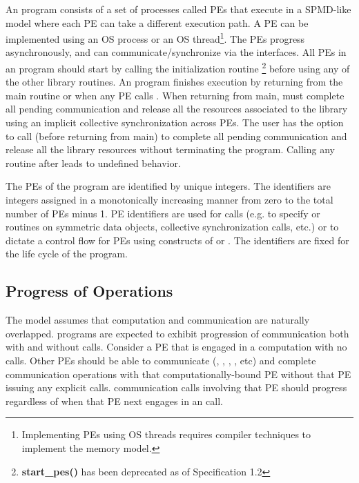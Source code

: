 An \openshmem program consists of a set of \openshmem processes called \ac{PE}s
that execute in a \ac{SPMD}-like model where each \ac{PE} can take a different
execution path. A \ac{PE} can be implemented using an OS process or an OS
thread\footnote{Implementing \ac{PE}s using OS threads requires compiler
techniques to implement the \openshmem memory model.}.  The \ac{PE}s progress
asynchronously, and can communicate/synchronize via the \openshmem interfaces.
All \ac{PE}s in an \openshmem program should start by calling the initialization
routine   \footnote{\textbf{start\_pes()} has been
deprecated as of Specification 1.2} before using any of the other \openshmem
library routines.  An \openshmem program finishes execution by returning from
the main routine or when any PE calls . When returning
from main, \openshmem must complete all pending communication and release all
the resources associated to the library using an implicit collective
synchronization across PEs. The user has the option to call
 (before returning from main) to complete all pending
communication and release all the \openshmem library resources without
terminating the program. Calling any \openshmem routine after
 leads to undefined behavior.

The \ac{PE}s of the \openshmem program are identified by unique integers.
The identifiers are integers assigned in a monotonically increasing manner from
zero to the total number of \ac{PE}s minus 1. \ac{PE} identifiers are used for
\openshmem calls (e.g. to specify \PUT or \GET routines on symmetric data
objects, collective synchronization calls, etc.) or to dictate a control flow
for \ac{PE}s using constructs of \Clang or \Fortran. The identifiers are fixed
for the life cycle of the \openshmem program.

\subsection{Progress of \openshmem Operations}\label{subsec:progress}

The \openshmem model assumes that computation and communication are naturally
overlapped. \openshmem programs are expected to exhibit progression of
communication both with and without \openshmem calls. Consider a \ac{PE} that is
engaged in a computation with no \openshmem calls. Other \ac{PE}s should be able
to communicate (, , , , etc) and
complete communication operations with that computationally-bound \ac{PE}
without that \ac{PE} issuing any explicit \openshmem calls. \openshmem
communication calls involving that \ac{PE} should progress regardless of when
that \ac{PE} next engages in an \openshmem call.


